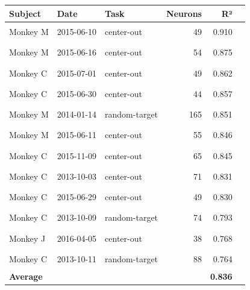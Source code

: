 \begin{center}\renewcommand{\arraystretch}{1.12}
\begin{tabular}{l l l r r l}\toprule
\textbf{Subject} & \textbf{Date} & \textbf{Task} & \textbf{Neurons} & \textbf{R²} & \\ \midrule
Monkey M & 2015-06-10 & center-out & 49 & 0.910 & \textcolor{lmauve}{\rule{3.64cm}{1.6ex}} \\
Monkey M & 2015-06-16 & center-out & 54 & 0.875 & \textcolor{lmauve}{\rule{3.50cm}{1.6ex}} \\
Monkey C & 2015-07-01 & center-out & 49 & 0.862 & \textcolor{lmauve}{\rule{3.45cm}{1.6ex}} \\
Monkey C & 2015-06-30 & center-out & 44 & 0.857 & \textcolor{lmauve}{\rule{3.43cm}{1.6ex}} \\
Monkey M & 2014-01-14 & random-target & 165 & 0.851 & \textcolor{lmauve}{\rule{3.41cm}{1.6ex}} \\
Monkey M & 2015-06-11 & center-out & 55 & 0.846 & \textcolor{lmauve}{\rule{3.38cm}{1.6ex}} \\
Monkey C & 2015-11-09 & center-out & 65 & 0.845 & \textcolor{lmauve}{\rule{3.38cm}{1.6ex}} \\
Monkey C & 2013-10-03 & center-out & 71 & 0.831 & \textcolor{lmauve}{\rule{3.32cm}{1.6ex}} \\
Monkey C & 2015-06-29 & center-out & 49 & 0.830 & \textcolor{lmauve}{\rule{3.32cm}{1.6ex}} \\
Monkey C & 2013-10-09 & random-target & 74 & 0.793 & \textcolor{lmauve}{\rule{3.17cm}{1.6ex}} \\
Monkey J & 2016-04-05 & center-out & 38 & 0.768 & \textcolor{lmauve}{\rule{3.07cm}{1.6ex}} \\
Monkey C & 2013-10-11 & random-target & 88 & 0.764 & \textcolor{lmauve}{\rule{3.06cm}{1.6ex}} \\
\midrule \textbf{Average} & & & & \textbf{0.836} & \\ \bottomrule
\end{tabular}\end{center}
